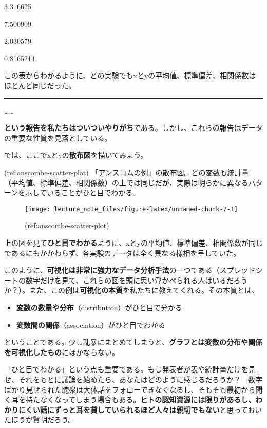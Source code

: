 \documentclass[]{book}
\begin{document}
3.316625

7.500909

2.030579

0.8165214

この表からわかるように、どの実験でもxとyの平均値、標準偏差、相関係数はほとんど同じだった。

\begin{center}\rule{0.5\linewidth}{\linethickness}\end{center}

\ldots{}\ldots{}

\textbf{という報告を私たちはついついやりがち}である。しかし、これらの報告はデータの重要な性質を見落としている。

では、ここでxとyの\textbf{散布図}を描いてみよう。

(ref:anscombe-scatter-plot)
「アンスコムの例」の散布図。どの変数も統計量（平均値、標準偏差、相関係数）の上では同じだが、実際は明らかに異なるパターンを示していることがひと目でわかる。

\begin{figure}

{\centering \texttt{[image: lecture\_note\_files/figure-latex/unnamed-chunk-7-1]} 

}

\caption{(ref:anscombe-scatter-plot)}\label{fig:unnamed-chunk-7}
\end{figure}

上の図を見て\textbf{ひと目でわかる}ように、xとyの平均値、標準偏差、相関係数が同じであるにもかかわらず、各実験のデータは全く異なる様相を呈していた。

このように、\textbf{可視化は非常に強力なデータ分析手法}の一つである（スプレッドシートの数字だけを見て、これらの図を頭に思い浮かべられる人はいるだろうか？）。また、この例は\textbf{可視化の本質}を私たちに教えてくれる。その本質とは、

\begin{itemize}
\item
  \textbf{変数の数量や分布}（distribution）がひと目で分かる
\item
  \textbf{変数間の関係}（association）がひと目でわかる
\end{itemize}

ということである。少し乱暴にまとめてしまうと、\textbf{グラフとは変数の分布や関係を可視化したもの}にほかならない。

「ひと目でわかる」という点も重要である。もし発表者が表や統計量だけを見せ、それをもとに議論を始めたら、あなたはどのように感じるだろうか？　数字ばかり見せられた聴衆は大体話をフォローできなくなるし、そもそも最初から聞く耳を持たなくなってしまう場合もある。\textbf{ヒトの認知資源には限りがあるし、わかりにくい話にずっと耳を貸していられるほど人々は親切でもない}と思っておいたほうが賢明だろう。
\end{document}
